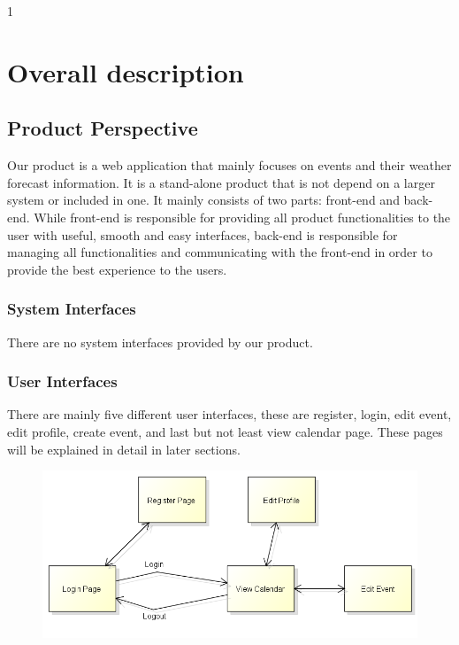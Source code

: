 \newpage
\setcounter{section}1
\section{Overall description}
\subsection{Product Perspective}
\quad Our product is a web application that mainly focuses on events and their weather forecast information. It is a stand-alone product that is not depend on a larger system or included in one. It mainly consists of two parts: front-end and back-end. While front-end is responsible for providing all product functionalities to the user with useful, smooth and easy interfaces, back-end is responsible for managing all functionalities and communicating with the front-end in order to provide the best experience to the users.

\subsubsection{System Interfaces}
\quad There are no system interfaces provided by our product.

\subsubsection{User Interfaces}
\quad There are mainly five different user interfaces, these are register, login, edit event, edit profile, create event, and last but not least view calendar page. These pages will be explained in detail in later sections.
\begin{figure}[tbh]
  \begin{center}
  \includegraphics[width=150mm]{Flowchart0}
    \label{Fig 1:}
  \end{center}
\end{figure}
\newpage
